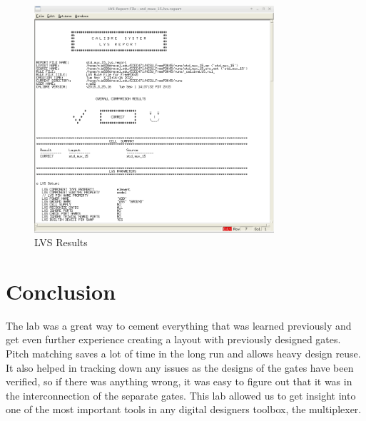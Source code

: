 \documentclass[12pt]{article}
\begin{document}
\begin{figure}[!htb]
  \centering
  \includegraphics[width=3.5in]{figures/lvs.png}
  \caption{LVS Results}\label{fig:lvs}
\end{figure}
\clearpage
\section{Conclusion}
The lab was a great way to cement everything that was learned previously and get even further experience
creating a layout with previously designed gates. Pitch matching saves a lot of time in the long run and
allows heavy design reuse. It also helped in tracking down any issues as the designs of the gates have
been verified, so if there was anything wrong, it was easy to figure out that it was in the interconnection
of the separate gates. This lab allowed us to get insight into one of the most important tools in any
digital designers toolbox, the multiplexer.
\end{document}
